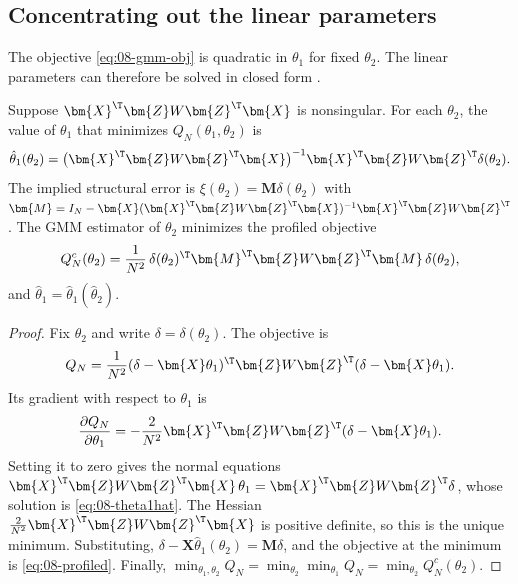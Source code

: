 \subsection{Concentrating out the linear parameters}\label{sec:08-concentrate}

The objective \eqref{eq:08-gmm-obj} is quadratic in $\theta_1$ for fixed $\theta_2$. The linear parameters
can therefore be solved in closed form \citep[p.~868]{BerryLevinsohnPakes1995}.

\begin{proposition}\label{prop:08-concentrate}
Suppose $\bm{X}^\T\bm{Z}W\bm{Z}^\T\bm{X}$ is nonsingular. For each $\theta_2$, the value of $\theta_1$ that
minimizes $Q_N(\theta_1, \theta_2)$ is
\begin{equation}\label{eq:08-theta1hat}
  \hat\theta_1(\theta_2) = \big(\bm{X}^\T\bm{Z}W\bm{Z}^\T\bm{X}\big)^{-1}\bm{X}^\T\bm{Z}W\bm{Z}^\T\delta(\theta_2).
\end{equation}
The implied structural error is $\xi(\theta_2) = \bm{M}\delta(\theta_2)$ with $\bm{M} = I_N -
\bm{X}(\bm{X}^\T\bm{Z}W\bm{Z}^\T\bm{X})^{-1}\bm{X}^\T\bm{Z}W\bm{Z}^\T$. The GMM estimator of $\theta_2$
minimizes the profiled objective
\begin{equation}\label{eq:08-profiled}
  Q^c_N(\theta_2) = \frac{1}{N^2}\,\delta(\theta_2)^\T\bm{M}^\T\bm{Z}W\bm{Z}^\T\bm{M}\,\delta(\theta_2),
\end{equation}
and $\hat\theta_1 = \hat\theta_1(\hat\theta_2)$.
\end{proposition}

\begin{proof}
Fix $\theta_2$ and write $\delta = \delta(\theta_2)$. The objective is
\begin{equation*}
  Q_N = \frac{1}{N^2}(\delta - \bm{X}\theta_1)^\T\bm{Z}W\bm{Z}^\T(\delta - \bm{X}\theta_1).
\end{equation*}
Its gradient with respect to $\theta_1$ is
\begin{equation*}
  \frac{\partial Q_N}{\partial \theta_1} = -\frac{2}{N^2}\bm{X}^\T\bm{Z}W\bm{Z}^\T(\delta - \bm{X}\theta_1).
\end{equation*}
Setting it to zero gives the normal equations $\bm{X}^\T\bm{Z}W\bm{Z}^\T\bm{X}\,\theta_1 =
\bm{X}^\T\bm{Z}W\bm{Z}^\T\delta$, whose solution is \eqref{eq:08-theta1hat}. The Hessian
$\frac{2}{N^2}\bm{X}^\T\bm{Z}W\bm{Z}^\T\bm{X}$ is positive definite, so this is the unique minimum.
Substituting, $\delta - \bm{X}\hat\theta_1(\theta_2) = \bm{M}\delta$, and the objective at the minimum is
\eqref{eq:08-profiled}. Finally, $\min_{\theta_1,\theta_2}Q_N = \min_{\theta_2}\min_{\theta_1}Q_N =
\min_{\theta_2}Q^c_N(\theta_2)$.
\end{proof}

